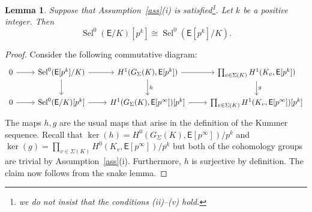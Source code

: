 \documentclass[10pt,a4paper]{amsart}
\newtheorem{lemma}{Lemma}
\newcommand{\EC}{\mathsf{E}}
\newcommand{\Sel}{\operatorname{Sel}}
\begin{document}
\begin{lemma}
\label{isom:different-selmer}
Suppose that Assumption~\ref{ass}\textup{(}i\textup{)} is satisfied\footnote{we do not insist that the conditions (ii)--{(v)} hold.}.
Let $k$ be a positive integer.
Then
\[
\Sel^0(\EC/K)[p^k]\cong \Sel^0(\EC[p^k]/K).
\]
\end{lemma}

\begin{proof}
Consider the following commutative diagram:
\[
\begin{tikzcd}
        0\arrow[r] &\Sel^0(\EC[p^k]/K) \arrow[r]\arrow[d]&H^1(G_\Sigma(K),\EC[p^k])\arrow[r]\arrow[d,"h"]& \prod_{v\in \Sigma(K)}H^1(K_{v},\EC[p^k])\arrow[d,"g"]\\
        0\arrow[r] &\Sel^0(\EC/K)[p^k] \arrow[r]&H^1(G_\Sigma(K),\EC[p^\infty])[p^k]\arrow[r]& \prod_{v\in \Sigma(K)}H^1(K_{v},\EC[p^\infty])[p^k]
\end{tikzcd}
\]
The maps $h,g$ are the usual maps that arise in the definition of the Kummer sequence.
Recall that $\ker(h) = H^0(G_\Sigma(K),\EC[p^\infty])/p^k$ and $\ker(g)=\prod_{v\in \Sigma(K)}H^0(K_v,\EC[p^\infty])/p^k$ but both of the cohomology groups are trivial by Assumption~\ref{ass}(i).
Furthermore, $h$ is surjective by definition.
The claim now follows from the snake lemma.
\end{proof}
\end{document}
